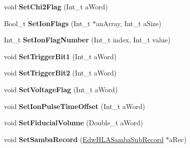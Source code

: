 \begin{DoxyCompactItemize}
\item 
\hypertarget{class_edw_h_l_a_single_bolo_sub_record_a03b2ff7f4424ab9280abab7e61578c1c}{
void {\bfseries SetChi2Flag} (Int\_\-t aWord)}
\label{class_edw_h_l_a_single_bolo_sub_record_a03b2ff7f4424ab9280abab7e61578c1c}

\item 
\hypertarget{class_edw_h_l_a_single_bolo_sub_record_ad8e5b6839f9d83219afca3a1f75cf75e}{
Bool\_\-t {\bfseries SetIonFlags} (Int\_\-t $\ast$anArray, Int\_\-t aSize)}
\label{class_edw_h_l_a_single_bolo_sub_record_ad8e5b6839f9d83219afca3a1f75cf75e}

\item 
\hypertarget{class_edw_h_l_a_single_bolo_sub_record_a914ebdc0a2be7628081b45dbd64b33c3}{
Int\_\-t {\bfseries SetIonFlagNumber} (Int\_\-t index, Int\_\-t value)}
\label{class_edw_h_l_a_single_bolo_sub_record_a914ebdc0a2be7628081b45dbd64b33c3}

\item 
\hypertarget{class_edw_h_l_a_single_bolo_sub_record_a308d0f0e81500e753d1ef95d82351c3b}{
void {\bfseries SetTriggerBit1} (Int\_\-t aWord)}
\label{class_edw_h_l_a_single_bolo_sub_record_a308d0f0e81500e753d1ef95d82351c3b}

\item 
\hypertarget{class_edw_h_l_a_single_bolo_sub_record_a3d67be706179cceababb697240b99fe5}{
void {\bfseries SetTriggerBit2} (Int\_\-t aWord)}
\label{class_edw_h_l_a_single_bolo_sub_record_a3d67be706179cceababb697240b99fe5}

\item 
\hypertarget{class_edw_h_l_a_single_bolo_sub_record_a49eb7a61972f7b6ac0c2bc6edb71c0d1}{
void {\bfseries SetVoltageFlag} (Int\_\-t aWord)}
\label{class_edw_h_l_a_single_bolo_sub_record_a49eb7a61972f7b6ac0c2bc6edb71c0d1}

\item 
\hypertarget{class_edw_h_l_a_single_bolo_sub_record_adeeebc192ce8e49fded045a216998a95}{
void {\bfseries SetIonPulseTimeOffset} (Int\_\-t aWord)}
\label{class_edw_h_l_a_single_bolo_sub_record_adeeebc192ce8e49fded045a216998a95}

\item 
\hypertarget{class_edw_h_l_a_single_bolo_sub_record_a692f44a2e82c093383c5483f622c287b}{
void {\bfseries SetFiducialVolume} (Double\_\-t aWord)}
\label{class_edw_h_l_a_single_bolo_sub_record_a692f44a2e82c093383c5483f622c287b}

\item 
\hypertarget{class_edw_h_l_a_single_bolo_sub_record_a361fb124b0c4bd3b53ad2ce9dc934c61}{
void {\bfseries SetSambaRecord} (\hyperlink{class_edw_h_l_a_samba_sub_record}{EdwHLASambaSubRecord} $\ast$aRec)}
\label{class_edw_h_l_a_single_bolo_sub_record_a361fb124b0c4bd3b53ad2ce9dc934c61}


\end{DoxyCompactItemize}
